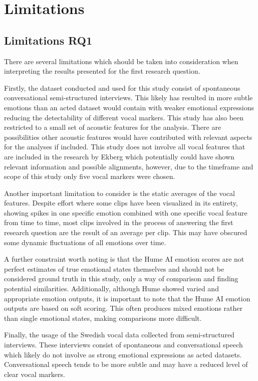 \section{Limitations}

\subsection{Limitations RQ1}
There are several limitations which should be taken into consideration when interpreting the results presented for the first research question.

Firstly, the dataset conducted and used for this study consist of spontaneous conversational semi-structured interviews. This likely has resulted in more subtle emotions than an acted dataset would contain with weaker emotional expressions reducing the detectability of different vocal markers. 
This study has also been restricted to a small set of acoustic features for the analysis. There are possibilities other acoustic features would have contributed with relevant aspects for the analyses if included. This study does not involve all vocal features that are included in the research by Ekberg \autocite{Ekberg2023} which potentially could have shown relevant information and possible alignments, however, due to the timeframe and scope of this study only five vocal markers were chosen.

Another important limitation to consider is the static averages of the vocal features. Despite effort where some clips have been visualized in its entirety, showing spikes in one specific emotion combined with one specific vocal feature from time to time, most clips involved in the process of answering the first research question are the result of an average per clip. This may have obscured some dynamic fluctuations of all emotions over time.

A further constraint worth noting is that the Hume AI emotion scores are not perfect estimates of true emotional states themselves and should not be considered ground truth in this study, only a way of comparison and finding potential similarities. Additionally, although Hume showed varied and appropriate emotion outputs, it is important to note that the Hume AI emotion outputs are based on soft scoring. This often produces mixed emotions rather than single emotional states, making comparisons more difficult.

Finally, the usage of the Swedish vocal data collected from semi-structured interviews. These interviews consist of spontaneous and conversational speech which likely do not involve as strong emotional expressions as acted datasets. Conversational speech tends to be more subtle and may have a reduced level of clear vocal markers. 

